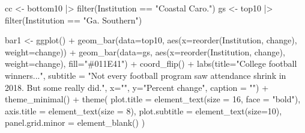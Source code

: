 \documentclass[
  letterpaper,
  DIV=11,
  numbers=noendperiod]{scrreprt}
\newenvironment{Shaded}{\begin{snugshade}}{\end{snugshade}}
\newcommand{\AttributeTok}[1]{\textcolor[rgb]{0.40,0.45,0.13}{#1}}
\newcommand{\DecValTok}[1]{\textcolor[rgb]{0.68,0.00,0.00}{#1}}
\newcommand{\FunctionTok}[1]{\textcolor[rgb]{0.28,0.35,0.67}{#1}}
\newcommand{\NormalTok}[1]{\textcolor[rgb]{0.00,0.23,0.31}{#1}}
\newcommand{\OtherTok}[1]{\textcolor[rgb]{0.00,0.23,0.31}{#1}}
\newcommand{\SpecialCharTok}[1]{\textcolor[rgb]{0.37,0.37,0.37}{#1}}
\newcommand{\StringTok}[1]{\textcolor[rgb]{0.13,0.47,0.30}{#1}}
\begin{document}
\begin{Shaded}
\begin{Highlighting}[]
\NormalTok{cc }\OtherTok{\textless{}{-}}\NormalTok{ bottom10 }\SpecialCharTok{|\textgreater{}} \FunctionTok{filter}\NormalTok{(Institution }\SpecialCharTok{==} \StringTok{"Coastal Caro."}\NormalTok{)}
\NormalTok{gs }\OtherTok{\textless{}{-}}\NormalTok{ top10 }\SpecialCharTok{|\textgreater{}} \FunctionTok{filter}\NormalTok{(Institution }\SpecialCharTok{==} \StringTok{"Ga. Southern"}\NormalTok{)}
\end{Highlighting}
\end{Shaded}

\begin{Shaded}
\begin{Highlighting}[]
\NormalTok{bar1 }\OtherTok{\textless{}{-}} \FunctionTok{ggplot}\NormalTok{() }\SpecialCharTok{+} 
  \FunctionTok{geom\_bar}\NormalTok{(}\AttributeTok{data=}\NormalTok{top10, }\FunctionTok{aes}\NormalTok{(}\AttributeTok{x=}\FunctionTok{reorder}\NormalTok{(Institution, change), }\AttributeTok{weight=}\NormalTok{change)) }\SpecialCharTok{+} 
  \FunctionTok{geom\_bar}\NormalTok{(}\AttributeTok{data=}\NormalTok{gs, }\FunctionTok{aes}\NormalTok{(}\AttributeTok{x=}\FunctionTok{reorder}\NormalTok{(Institution, change), }\AttributeTok{weight=}\NormalTok{change), }\AttributeTok{fill=}\StringTok{"\#011E41"}\NormalTok{) }\SpecialCharTok{+} 
  \FunctionTok{coord\_flip}\NormalTok{() }\SpecialCharTok{+} 
  \FunctionTok{labs}\NormalTok{(}\AttributeTok{title=}\StringTok{"College football winners..."}\NormalTok{, }\AttributeTok{subtitle =} \StringTok{"Not every football program saw attendance shrink in 2018. But some really did."}\NormalTok{,  }\AttributeTok{x=}\StringTok{""}\NormalTok{, }\AttributeTok{y=}\StringTok{"Percent change"}\NormalTok{, }\AttributeTok{caption =} \StringTok{""}\NormalTok{) }\SpecialCharTok{+}
  \FunctionTok{theme\_minimal}\NormalTok{() }\SpecialCharTok{+} 
  \FunctionTok{theme}\NormalTok{(}
    \AttributeTok{plot.title =} \FunctionTok{element\_text}\NormalTok{(}\AttributeTok{size =} \DecValTok{16}\NormalTok{, }\AttributeTok{face =} \StringTok{"bold"}\NormalTok{),}
    \AttributeTok{axis.title =} \FunctionTok{element\_text}\NormalTok{(}\AttributeTok{size =} \DecValTok{8}\NormalTok{), }
    \AttributeTok{plot.subtitle =} \FunctionTok{element\_text}\NormalTok{(}\AttributeTok{size=}\DecValTok{10}\NormalTok{), }
    \AttributeTok{panel.grid.minor =} \FunctionTok{element\_blank}\NormalTok{()}
\NormalTok{    )}
\end{Highlighting}
\end{Shaded}
\end{document}

